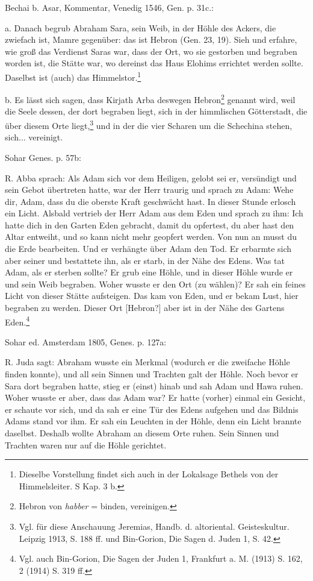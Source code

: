 \documentclass[a4paper, 11pt, oneside]{article}
\begin{document}
Bechai b. Asar, Kommentar, Venedig 1546, Gen. p. 31c.:

a. Danach begrub Abraham Sara, sein Weib, in der Höhle des Ackers, die zwiefach ist, Mamre gegenüber: das ist Hebron (Gen. 23, 19). Sieh und erfahre, wie groß das Verdienst Saras war, dass der Ort, wo sie gestorben und begraben worden ist, die Stätte war, wo dereinst das Haus Elohims errichtet werden sollte. Daselbst ist (auch) das Himmelstor.\footnote{Dieselbe Vorstellung findet sich auch in der Lokalsage Bethels von der Himmelsleiter. S Kap. 3 b.}

b. Es lässt sich sagen, dass Kirjath Arba deswegen Hebron\footnote{Hebron von \emph{habber} = binden, vereinigen.} genannt wird, weil die Seele dessen, der dort begraben liegt, sich in der himmlischen Götterstadt, die über diesem Orte liegt,\footnote{Vgl. für diese Anschauung Jeremias, Handb. d. altoriental. Geisteskultur. Leipzig 1913, S. 188 ff. und Bin-Gorion, Die Sagen d. Juden 1, S. 42.} und in der die vier Scharen um die Schechina stehen, sich... vereinigt.

Sohar Genes. p. 57b:

R. Abba sprach: Als Adam sich vor dem Heiligen, gelobt sei er, versündigt und sein Gebot übertreten hatte, war der Herr traurig und sprach zu Adam: Wehe dir, Adam, dass du die oberste Kraft geschwächt hast. In dieser Stunde erlosch ein Licht. Alsbald vertrieb der Herr Adam aus dem Eden und sprach zu ihm: Ich hatte dich in den Garten Eden gebracht, damit du opfertest, du aber hast den Altar entweiht, und so kann nicht mehr geopfert werden. Von nun an musst du die Erde bearbeiten. Und er verhängte über Adam den Tod. Er erbarmte sich aber seiner und bestattete ihn, als er starb, in der Nähe des Edens. Was tat Adam, als er sterben sollte? Er grub eine Höhle, und in dieser Höhle wurde er und sein Weib begraben. Woher wusste er den Ort (zu wählen)? Er sah ein feines Licht von dieser Stätte aufsteigen. Das kam von Eden, und er bekam Lust, hier begraben zu werden. Dieser Ort [Hebron?] aber ist in der Nähe des Gartens Eden.\footnote{Vgl. auch Bin-Gorion, Die Sagen der Juden 1, Frankfurt a. M. (1913) S. 162, 2 (1914) S. 319 ff.}

Sohar ed. Amsterdam 1805, Genes. p. 127a:

R. Juda sagt: Abraham wusste ein Merkmal (wodurch er die zweifache Höhle finden konnte), und all sein Sinnen und Trachten galt der Höhle. Noch bevor er Sara dort begraben hatte, stieg er (einst) hinab und sah Adam und Hawa ruhen. Woher wusste er aber, dass das Adam war? Er hatte (vorher) einmal ein Gesicht, er schaute vor sich, und da sah er eine Tür des Edens aufgehen und das Bildnis Adams stand vor ihm. Er sah ein Leuchten in der Höhle, denn ein Licht brannte daselbst. Deshalb wollte Abraham an diesem Orte ruhen. Sein Sinnen und Trachten waren nur auf die Höhle gerichtet.
\end{document}
